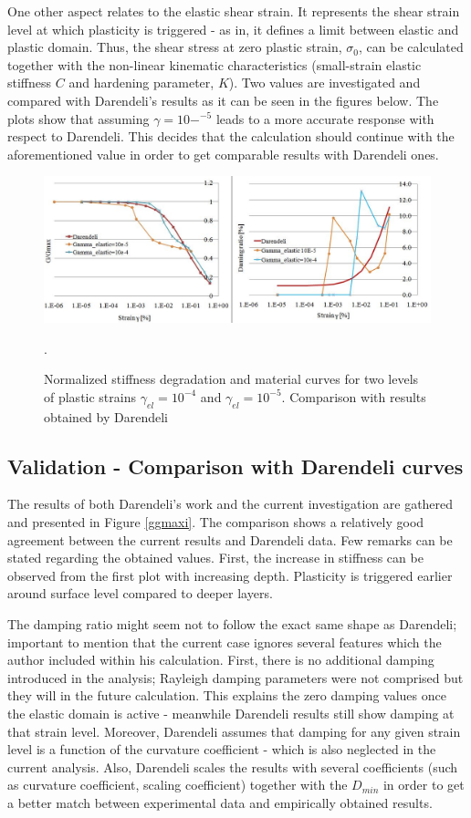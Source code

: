 \documentclass[12pt,a4paper]{report}
\begin{document}
One other aspect relates to the elastic shear strain. It represents the shear strain level at which plasticity is triggered - as in, it defines a limit between elastic and plastic domain. Thus, the shear stress at zero plastic strain, $\sigma_0$, can be calculated together with the non-linear kinematic characteristics (small-strain elastic stiffness $C$ and hardening parameter, $K$). Two values are investigated and compared with Darendeli's results as it can be seen in the figures below. The plots show that assuming $\gamma=10-^{-5}$ leads to a more accurate response with respect to Darendeli. This decides that the calculation should continue with the aforementioned value in order to get comparable results with Darendeli ones.

\begin{figure}[h!]
	\centering
	\includegraphics[width=1\linewidth]{"ggmax2"}
	\caption{Normalized stiffness degradation and material curves for two levels of plastic strains $\gamma_{el}=10^{-4}$ and $\gamma_{el}=10^{-5}$. Comparison with results obtained by Darendeli}
	\label{ggmax}.
\end{figure}

\subsection{Validation - Comparison with Darendeli curves}
The results of both Darendeli's work and the current investigation are gathered and presented in Figure \ref{ggmaxi}. The comparison shows a relatively good agreement between the current results and Darendeli data. Few remarks can be stated regarding the obtained values. First, the increase in stiffness can be observed from the first plot with increasing depth. Plasticity is triggered earlier around surface level compared to deeper layers. 

The damping ratio might seem not to follow the exact same shape as Darendeli; important to mention that the current case ignores several features which the author included within his calculation. First, there is no additional damping introduced in the analysis; Rayleigh damping parameters were not comprised but they will in the future calculation. This explains the zero damping values once the elastic domain is active - meanwhile Darendeli results still show damping at that strain level. Moreover, Darendeli assumes that damping for any given strain level is a function of the curvature coefficient - which is also neglected in the current analysis. Also, Darendeli scales the results with several coefficients (such as curvature coefficient, scaling coefficient) together with the $D_{min}$ in order to get a better match between experimental data and empirically obtained results. 
\end{document}
